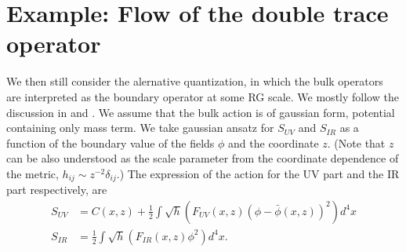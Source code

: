 \documentclass[12pt,epsbox]{article}
\numberwithin{equation}{section}
\begin{document}

\section{Example: Flow of the double trace operator}

We then still consider the alernative quantization, in which the bulk operators are interpreted as the boundary operator at some RG scale. We mostly follow the discussion in \cite{Polchinski} and \cite{MukundHRG}. We assume that the bulk action is of gaussian form, potential containing only mass term. We take gaussian ansatz for $S_{UV}$ and $S_{IR}$ as a function of the boundary value of the fields $\phi$ and the coordinate $z$. (Note that $z$ can be also understood as the scale parameter from the coordinate dependence of the metric, $h_{ij} \sim z^{-2} \delta_{ij}$.)
The expression of the action for the UV part and the IR part respectively, are
\begin{equation}
\begin{split}
S_{UV}&=C(x,z)+ \frac{1}{2} \int \sqrt{h} \left( F_{UV}(x,z) (\phi-\bar{\phi}(x,z))^2 \right) d^4x \\
S_{IR}&= \frac{1}{2} \int \sqrt{h} \left( F_{IR}(x,z) \phi^2 \right) d^4x .
\end{split}
\end{equation}
\end{document}
